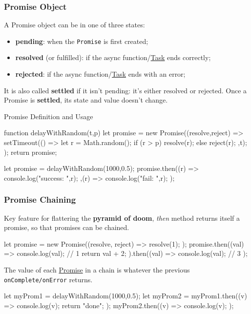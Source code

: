 \subsubsection{Promise Object}\label{sub:rs_promise_object} %
A Promise object can be in one of three states:
\begin{itemize}
    \item \textbf{pending}: when the \texttt{Promise} is first created;
    \item \textbf{resolved} (or fulfilled): if the async function/\hyperref[def:task]{Task} ends correctly;
    \item \textbf{rejected}: if the async function/\hyperref[def:task]{Task} ends with an error;
\end{itemize}
\begin{note}
    It is also called \textbf{settled} if it isn't pending: it's either resolved or rejected.
    Once a Promise is \textbf{settled}, its state and value doesn't change.
\end{note}
\begin{example}{Promise Definition and Usage}{}
    \begin{codeblock}[js]{}
    function delayWithRandom(t,p){
        let promise = new Promise((resolve,reject) => {
            setTimeout(() => {
                let r = Math.random();
                if (r > p) {
                    resolve(r);
                } else {
                    reject(r);
                }
            },t);
        });
        return promise;
    }

    let promise = delayWithRandom(1000,0.5);
    promise.then((r) => {
        console.log("success: ",r);
    },(r) => {
        console.log("fail: ",r);
    });
    \end{codeblock}
\end{example}
%
\subsubsection{Promise Chaining}\label{sub:rs_promise_chaining} %
Key feature for flattering the \textbf{pyramid of doom}, \textit{then} method returns itself a promise, so that promises can be chained.
\begin{codeblock}[js]{}
    let promise = new Promise((resolve, reject) => {
        resolve(1);
    });
    promise.then((val) => {
        console.log(val); // 1
        return val + 2;
    }).then((val) => {
        console.log(val); // 3
    });
\end{codeblock}
The value of each \hyperref[def:promises]{Promise} in a chain is whatever the previous \texttt{onComplete/onError} returns.
\begin{codeblock}[js]{}
    let myProm1 = delayWithRandom(1000,0.5);
    let myProm2 = myProm1.then((v) => {
        console.log(v);
        return "done";
    });
    myProm2.then((v) => {
        console.log(v);
    });
\end{codeblock}
%
